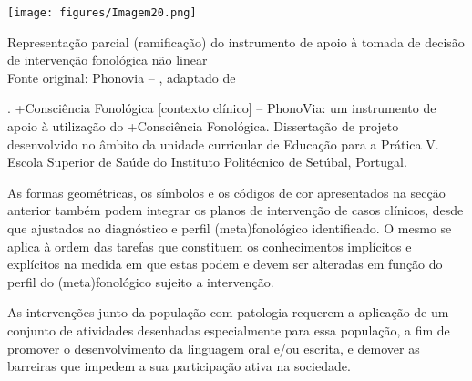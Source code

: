 \documentclass[output=paper,colorlinks,citecolor=brown,booklanguage=portuguese]{langscibook}
\begin{document}
\begin{Figura}
    \texttt{[image: figures/Imagem20.png]}
    \caption{Representação parcial (ramificação) do instrumento de apoio à tomada de decisão de intervenção fonológica não linear\\
    {\small Fonte original: Phonovia – \citet{Alvesemprep.}, adaptado de \citet{Julio2019}}}
    \parbox{\textwidth}{\scriptsize \citet{Julio2019}. {+Consciência Fonológica [contexto clínico] – PhonoVia: um instrumento de apoio à utilização do +Consciência Fonológica.} Dissertação de projeto desenvolvido no âmbito da unidade curricular de Educação para a Prática V. Escola Superior de Saúde do Instituto Politécnico de Setúbal, Portugal.}
    \label{fig:cap10fig8}
\end{Figura}


As formas geométricas, os símbolos e os códigos de cor apresentados na secção anterior também podem integrar os planos de intervenção de casos clínicos, desde que ajustados ao diagnóstico e perfil (meta)fonológico identificado. O mesmo se aplica à ordem das tarefas que constituem os conhecimentos implícitos e explícitos na medida em que estas podem e devem ser alteradas em função do perfil do (meta)fonológico sujeito a intervenção.

As intervenções junto da população com patologia requerem a aplicação de um conjunto de atividades desenhadas especialmente para essa população, a fim de promover o desenvolvimento da linguagem oral e/ou escrita, e demover as barreiras que impedem a sua participação ativa na sociedade. 
\end{document}
